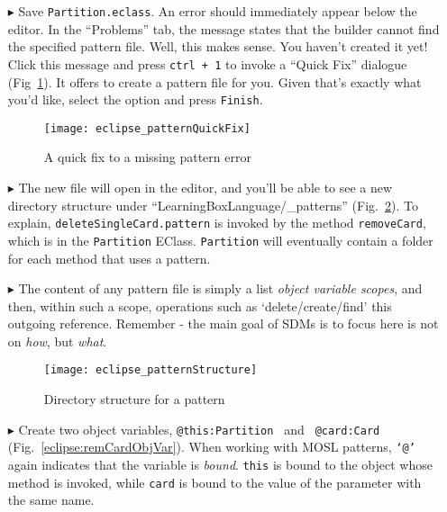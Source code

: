 \begin{itemize}
\item[$\blacktriangleright$] Save \texttt{Partition.eclass}. An error should immediately appear below the editor. In the ``Problems'' tab, the message
states that the builder cannot find the specified pattern file. Well, this makes sense. You haven't created it yet! Click this message and press \texttt{ctrl +
1} to invoke a ``Quick Fix'' dialogue (Fig~\ref{eclipse:quickFix}). It offers to create a pattern file for you. Given that's exactly what you'd like, select the
option and press \texttt{Finish}.

\vspace{0.5cm}

\begin{figure}[htp]
\begin{center}
  \texttt{[image: eclipse\_patternQuickFix]}
  \caption{A quick fix to a missing pattern error}
  \label{eclipse:quickFix}
\end{center}
\end{figure}

\item[$\blacktriangleright$] The new file will open in the editor, and you'll be able to see a new directory structure under ``LearningBoxLanguage/\_patterns''
(Fig.~\ref{eclipse:pattStruct}). To explain, \texttt{deleteSingleCard.pattern} is invoked by the method \texttt{removeCard}, which is in the \texttt{Partition}
EClass. \texttt{Partition} will eventually contain a folder for each method that uses a pattern.

\vspace{0.5cm}

\item[$\blacktriangleright$] The content of any pattern file is simply a list \emph{object variable scopes}, and then,
within such a scope, operations such as `delete/create/find' this outgoing reference. Remember - the main goal of SDMs is to focus here is not on \emph{how},
but \emph{what}.

\newpage

\begin{figure}[htp]
\begin{center}
  \texttt{[image: eclipse\_patternStructure]}
  \caption{Directory structure for a pattern}
  \label{eclipse:pattStruct}
\end{center}
\end{figure}

\item[$\blacktriangleright$] Create two object variables, \texttt{@this:Partition } and \texttt{ @card:Card}\\ (Fig.~\ref{eclipse:remCardObjVar}). When working
with MOSL patterns, \texttt{`@'} again indicates that the variable is \emph{bound}. \texttt{this} is bound to the object whose method is invoked,
while \texttt{card} is bound to the value of the parameter with the same name.


\end{itemize}
